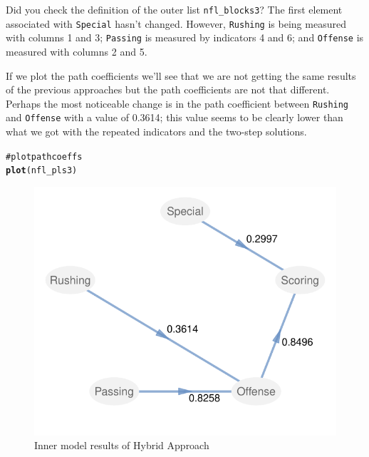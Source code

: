 \documentclass[12pt]{book}\usepackage{graphicx, color}
\makeatletter
\newcommand{\hlfunctioncall}[1]{\textcolor[rgb]{0.501960784313725,0,0.329411764705882}{\textbf{#1}}}%
\newcommand{\hlcomment}[1]{\textcolor[rgb]{0.180392156862745,0.6,0.341176470588235}{#1}}%
\newenvironment{kframe}{%
 \def\at@end@of@kframe{}%
 \ifinner\ifhmode%
  \def\at@end@of@kframe{\end{minipage}}%
  \begin{minipage}{\columnwidth}%
 \fi\fi%
 \def\FrameCommand##1{\hskip\@totalleftmargin \hskip-\fboxsep
 \colorbox{shadecolor}{##1}\hskip-\fboxsep
     \hskip-\linewidth \hskip-\@totalleftmargin \hskip\columnwidth}%
 \MakeFramed {\advance\hsize-\width
   \@totalleftmargin\z@ \linewidth\hsize
   \@setminipage}}%
 {\par\unskip\endMakeFramed%
 \at@end@of@kframe}
\newenvironment{knitrout}{}{} %
\newcommand{\code}[1]{\texttt{#1}}
\makeatother
\begin{document}
Did you check the definition of the outer list \code{nfl\_blocks3}? The first element associated with \code{Special} hasn't changed. However, \code{Rushing} is being measured with columns 1 and 3; \code{Passing} is measured by indicators 4 and 6; and \code{Offense} is measured with columns 2 and 5. 

If we plot the path coefficients we'll see that we are not getting the same results of the previous approaches but the path coefficients are not that different. Perhaps the most noticeable change is in the path coefficient between \code{Rushing} and \code{Offense} with a value of 0.3614; this value seems to be clearly lower than what we got with the repeated indicators and the two-step solutions. 
\begin{knitrout}
\color{fgcolor}\begin{kframe}
\begin{alltt}
\hlcomment{# plot path coeffs}
\hlfunctioncall{plot}(nfl_pls3)
\end{alltt}
\end{kframe}\begin{figure}[h]


{\centering \includegraphics[width=.75\linewidth,height=.45\linewidth]{figure/nlf_giveaway_path_coeff} 

}

\caption[Inner model results of Hybrid Approach]{Inner model results of Hybrid Approach\label{fig:nlf_giveaway_path_coeff}}
\end{figure}


\end{knitrout}
\end{document}
